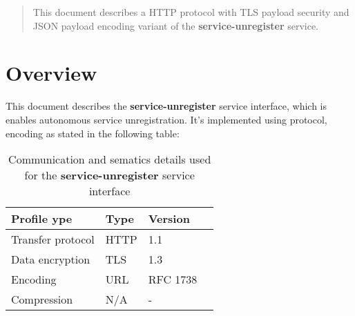 \documentclass[a4paper]{arrowhead}
\begin{document}
\ArrowheadDate{\today}
\ArrowheadSetup

\begin{center}
  \vspace*{1cm}
  \huge{\arrowtitle}

  \vspace*{0.2cm}
  \LARGE{\arrowtype}
  \vspace*{1cm}
\end{center}

  \vspace*{\fill}


  \vspace*{1cm}
  \vspace*{\fill}

  \begin{abstract}
    This document describes a HTTP protocol with TLS payload
    security and JSON payload encoding variant of the \textbf{service-unregister} service.
  \end{abstract}
  \vspace*{1cm}

\newpage

\tableofcontents
\newpage

\section{Overview}
\label{sec:overview}

This document describes the \textbf{service-unregister} service interface,
which is enables autonomous service unregistration. It's implemented using protocol, encoding as stated in the following table:

\begin{table}[ht!]
  \centering
  \begin{tabular}{|l|l|l|l|}
    \rowcolor{gray!33} Profile ype & Type & Version \\ \hline
    Transfer protocol & HTTP & 1.1 \\ \hline
    Data encryption & TLS & 1.3 \\ \hline
    Encoding & URL & RFC 1738 \\ \hline
    Compression & N/A & - \\ \hline
  \end{tabular}
  \caption{Communication and sematics details used for the \textbf{service-unregister}
    service interface}
  \label{tab:comunication_semantics_profile}
\end{table}
\end{document}
